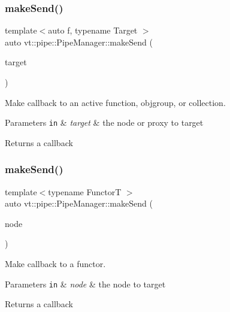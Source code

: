 \subsubsection{\texorpdfstring{make\+Send()}{makeSend()}\hspace{0.1cm}{\footnotesize\ttfamily [1/6]}}
{\footnotesize\ttfamily template$<$auto f, typename Target $>$ \\
auto vt\+::pipe\+::\+Pipe\+Manager\+::make\+Send (\begin{DoxyParamCaption}\item[{Target}]{target }\end{DoxyParamCaption})}



Make callback to an active function, objgroup, or collection. 


\begin{DoxyParams}[1]{Parameters}
\mbox{\tt in}  & {\em target} & the node or proxy to target\\
\hline
\end{DoxyParams}
\begin{DoxyReturn}{Returns}
a callback 
\end{DoxyReturn}
\mbox{\label{structvt_1_1pipe_1_1_pipe_manager_ac445facb2e7ba2bceb000d92a59d9e7e}} 
\subsubsection{\texorpdfstring{make\+Send()}{makeSend()}\hspace{0.1cm}{\footnotesize\ttfamily [2/6]}}
{\footnotesize\ttfamily template$<$typename FunctorT $>$ \\
auto vt\+::pipe\+::\+Pipe\+Manager\+::make\+Send (\begin{DoxyParamCaption}\item[{\hyperlink{namespacevt_a866da9d0efc19c0a1ce79e9e492f47e2}{Node\+Type}}]{node }\end{DoxyParamCaption})}



Make callback to a functor. 


\begin{DoxyParams}[1]{Parameters}
\mbox{\tt in}  & {\em node} & the node to target\\
\hline
\end{DoxyParams}
\begin{DoxyReturn}{Returns}
a callback 
\end{DoxyReturn}
\mbox{\label{structvt_1_1pipe_1_1_pipe_manager_a73583be6260418b13ee66e56cdade2da}} 
